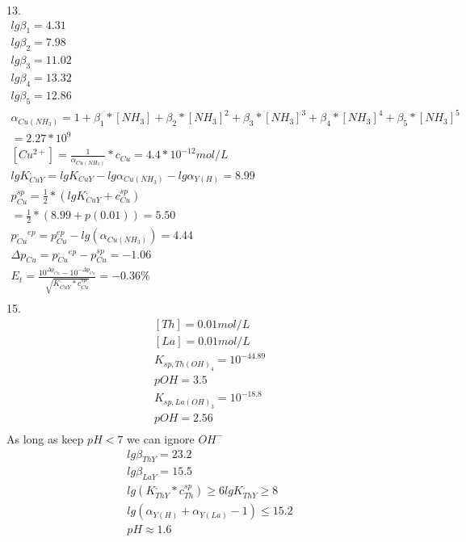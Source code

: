 \documentclass{article}
\begin{document}
13.\begin{equation}
    \begin{multlined}
        lg\beta_1 = 4.31\\
        lg\beta_2 = 7.98\\
        lg\beta_3 = 11.02\\
        lg\beta_4 = 13.32\\
        lg\beta_5 = 12.86\\
        \alpha_{Cu(NH_3)} = 1 + \beta_1*[NH_3] + \beta_2*[NH_3]^2 + \beta_3*[NH_3]^3 + \beta_4*[NH_3]^4 + \beta_5*[NH_3]^5\\
        =2.27*10^9\\
        [Cu^{2+}]=\frac{1}{\alpha_{Cu(NH_3)}}*c_{Cu} = 4.4*10^{-12} mol/L\\
        lgK^,_{CuY} =  lgK_{CuY} - lg\alpha_{Cu(NH_3)} - lg\alpha_{Y(H)} = 8.99\\
        p_{Cu}^{sp} = \frac{1}{2}*(lgK^,_{CuY} + c_{Cu}^{sp})\\
        = \frac{1}{2}*(8.99 + p(0.01)) = 5.50\\
        p^{,}_{Cu}^{ep} = p_{Cu}^{ep} - lg(\alpha_{Cu(NH_3)}) = 4.44\\
        \Delta p_{Cu} = p^{,}_{Cu}^{ep} - p_{Cu}^{sp} = -1.06\\
        E_t = \frac{10^{\Delta p_{Cu}} - 10^{-\Delta p_{Cu}}}{\sqrt{K^,_{CuY} * c_{Cu}^{sp}}} = -0.36\%\\
    \end{multlined}
\end{equation}
15.\begin{equation}
    \begin{multlined}
        [Th] = 0.01 mol/L\\
        [La] = 0.01 mol/L\\
        K_{sp, Th(OH)_4} = 10^{-44.89}\\
        pOH = 3.5\\
        K_{sp, La(OH)_3} = 10^{-18.8}\\
        pOH = 2.56\\
    \end{multlined}
\end{equation}
As long as keep $pH < 7$ we can ignore $OH^-$\\
\begin{equation}
    \begin{multlined}
        lg\beta_{ThY} = 23.2\\
        lg\beta_{LaY} = 15.5\\
        lg (K^,_{ThY}*c_{Th}^{sp})\geq 6
        lg K^,_{ThY} \geq 8\\
        lg (\alpha_{Y(H)} + \alpha_{Y(La)} - 1) \leq 15.2\\
        pH \approx 1.6\\
    \end{multlined}
\end{equation}
\end{document}
